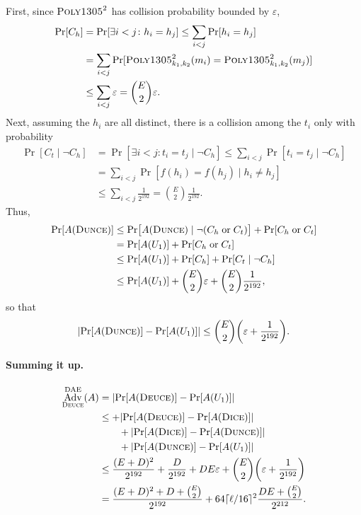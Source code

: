 \documentclass{article}
\def\operatorsc#1{{%
  \ifmmode\let\next=\operatorname\else\let\next=\relax\fi\next{\textsc{#1}}}}
\def\Poly#1/{\operatorsc{Poly#1}}
\def\DUNCE/{\operatorsc{Dunce}}
\def\DEUCE/{\operatorsc{Deuce}}
\def\DICE/{\operatorsc{Dice}}
\def\DAE{%
  \ifmmode\def\next{\operatorname{DAE}}%
    \else\def\next/{\textsc{dae}}%
  \fi\next}
\DeclareMathOperator{\Adv}{Adv}
\newcommand{\given}{\mathrel|}
\newcommand{\collisionbound}{\varepsilon}
\begin{document}
First, since $\Poly1305/^2$ has collision probability bounded by
 $\collisionbound$,
%
\begin{align*}
  \Pr[C_h]
    &= \Pr[\exists i<j\colon h_i = h_j]
     \leq \sum_{i<j} \Pr[h_i = h_j] \\
    &= \sum_{i<j}
         \Pr[\Poly1305/^2_{k_1,k_2}(m_i) = \Poly1305/^2_{k_1,k_2}(m_j)] \\
    &\leq \sum_{i<j} \collisionbound
     = \binom{E}{2} \collisionbound.
\end{align*}
%
Next, assuming the $h_i$ are all distinct, there is a collision among
 the $t_i$ only with probability
%
\begin{align*}
  \Pr[C_t \given \lnot C_h]
    &= \Pr[\exists i<j\colon t_i = t_j \given \lnot C_h]
     \leq \sum_{i<j} \Pr[t_i = t_j \given \lnot C_h] \\
    &= \sum_{i<j} \Pr[f(h_i) = f(h_j) \given h_i \ne h_j] \\
    &\leq \sum_{i<j} \frac{1}{2^{192}}
     = \binom{E}{2} \frac{1}{2^{192}}.
\end{align*}
%
Thus,
%
\begin{align*}
  \Pr[A(\DUNCE/)]
  &\leq \Pr\bigl[A(\DUNCE/) \given
            \lnot (C_h \mathrel{\text{or}} C_t)\bigr]
        + \Pr[C_h \mathrel{\text{or}} C_t] \\
  &= \Pr[A(U_1)] + \Pr[C_h \mathrel{\text{or}} C_t] \\
  &\leq \Pr[A(U_1)] + \Pr[C_h] + \Pr[C_t \given \lnot C_h] \\
  &\leq \Pr[A(U_1)] + \binom{E}{2} \collisionbound
        + \binom{E}{2} \frac{1}{2^{192}},
\end{align*}
%
 so that
\[
  \lvert\Pr[A(\DUNCE/)] - \Pr[A(U_1)]\rvert
  \leq \binom{E}{2} \biggl(\collisionbound + \frac{1}{2^{192}}\biggr).
\]

\paragraph*{Summing it up.}

\begin{align*}
  \Adv^{\DAE}_{\DEUCE/}(A)
  &= \lvert\Pr[A(\DEUCE/)] - \Pr[A(U_1)]\rvert \\
  &\leq + \lvert\Pr[A(\DEUCE/)] - \Pr[A(\DICE/)]\rvert \\
  &\qquad + \lvert\Pr[A(\DICE/)] - \Pr[A(\DUNCE/)]\rvert \\
  &\qquad + \lvert\Pr[A(\DUNCE/)] - \Pr[A(U_1)]\rvert \\
  &\leq \frac{(E + D)^2}{2^{192}}
          + \frac{D}{2^{192}} + D E \collisionbound
          + \binom{E}{2} \biggl(\collisionbound + \frac{1}{2^{192}}\biggr) \\
  &= \frac{(E + D)^2 + D + \binom{E}{2}}{2^{192}}
     + 64\lceil\ell/16\rceil^2 \frac{D E + \binom{E}{2}}{2^{212}}.
\end{align*}

\end{document}
